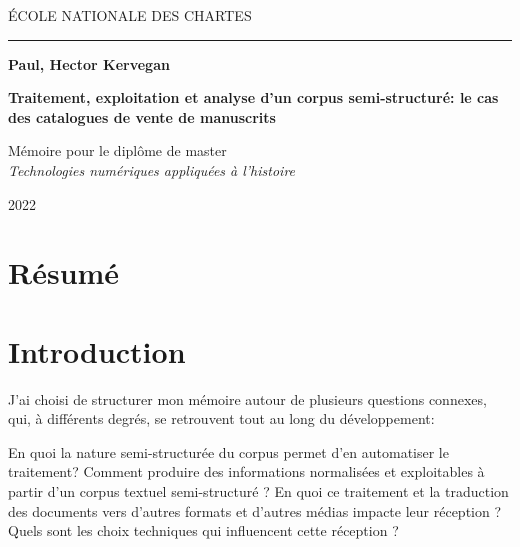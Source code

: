 \documentclass[a4paper, 12pt, twoside]{book}
\begin{document}
	\onehalfspacing
	
	\begin{titlepage}
		\begin{center}		
			\bigskip
			
			\begin{large}
				ÉCOLE NATIONALE DES CHARTES\\
			\end{large}
			
			\rule{2cm}{0.02cm}
			
			\begin{Large}
				\textbf{Paul, Hector Kervegan}\\
			\end{Large}
			
			\vfill
			
			\begin{Huge}
				\textbf{Traitement, exploitation et analyse d'un corpus semi-structuré: le cas des catalogues de vente de manuscrits}
			\end{Huge}
			
			\vfill
			
			\begin{large}
				Mémoire pour le diplôme de master \\
				\emph{Technologies numériques appliquées à l'histoire}
				
				\bigskip
				
				2022
			\end{large}
			
		\end{center}
	\end{titlepage}

\frontmatter
\chapter*{Résumé}

\mainmatter
\chapter*{Introduction}
J'ai choisi de structurer mon mémoire autour de plusieurs questions connexes, qui, à différents degrés, se retrouvent tout au long du développement:

En quoi la nature semi-structurée du corpus permet d'en automatiser le traitement? Comment produire des informations normalisées et exploitables à partir d'un corpus textuel semi-structuré ? En quoi ce traitement et la traduction des documents vers d'autres formats et d'autres médias impacte leur réception ? Quels sont les choix techniques qui influencent cette réception ?
\end{document}
